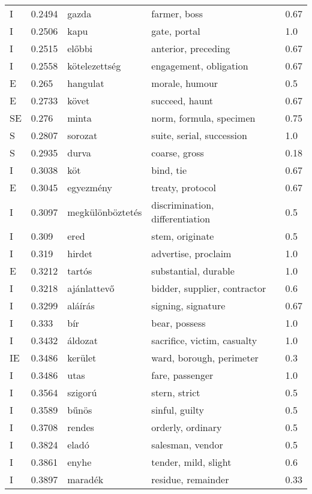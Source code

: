 \documentclass[11pt]{article}
\begin{document}
\begin{table*}
{\begin{tabular}{lllll}
      I	& 0.2494	& gazda	& farmer, boss	& 0.67 \\
      I	& 0.2506	& kapu	& gate, portal	& 1.0 \\
      I	& 0.2515	& előbbi	& anterior, preceding	& 0.67 \\
      I	& 0.2558	& kötelezettség	& engagement, obligation	& 0.67 \\
      E	& 0.265	& hangulat	& morale, humour	& 0.5 \\
      E	& 0.2733	& követ	& succeed, haunt	& 0.67 \\
      SE	& 0.276	& minta	& norm\s, formula\e, specimen\s	& 0.75  \\
      S	& 0.2807	& sorozat	& suite, serial, succession	& 1.0 \\
      S	& 0.2935	& durva	& coarse, gross	& 0.18 \\
      I	& 0.3038	& köt	& bind, tie	& 0.67 \\
      E	& 0.3045	& egyezmény	& treaty, protocol	& 0.67 \\
      I	& 0.3097	& megkülönböztetés	& discrimination, differentiation	& 0.5 \\
      I	& 0.309	& ered	& stem, originate	& 0.5 \\
      I	& 0.319	& hirdet	& advertise, proclaim	& 1.0 \\
      E	& 0.3212	& tartós	& substantial, durable	& 1.0 \\
      I	& 0.3218	& ajánlattevő	& bidder, supplier, contractor	& 0.6 \\
      I	& 0.3299	& aláírás	& signing, signature	& 0.67 \\
      I	& 0.333	& bír	& bear, possess	& 1.0 \\
      I	& 0.3432	& áldozat	& sacrifice, victim, casualty	& 1.0 \\
      IE	& 0.3486	& kerület	& ward\id, borough\id, perimeter\e	& 0.3  \\
      I	& 0.3486	& utas	& fare, passenger	& 1.0 \\
      I	& 0.3564	& szigorú	& stern, strict	& 0.5 \\
      I	& 0.3589	& bűnös	& sinful, guilty	& 0.5 \\
      I	& 0.3708	& rendes	& orderly, ordinary	& 0.5 \\
      I	& 0.3824	& eladó	& salesman, vendor	& 0.5 \\
      I	& 0.3861	& enyhe	& tender, mild, slight	& 0.6 \\
      I	& 0.3897	& maradék	& residue, remainder	& 0.33 \\

\end{tabular}}
\end{table*}
\end{document}
